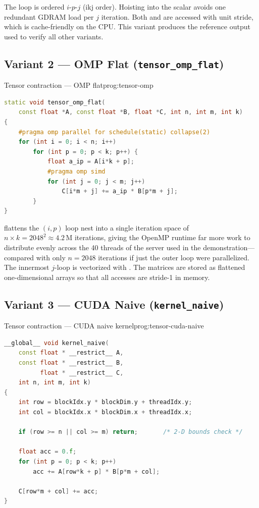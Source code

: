 The loop is ordered $i$-$p$-$j$ (ikj order). Hoisting 
into the scalar  avoids one redundant GDRAM load per $j$
iteration. Both  and  are accessed with
unit stride, which is cache-friendly on the CPU. This variant produces the
reference output used to verify all other variants.


\subsection{Variant 2 --- OMP Flat (\texttt{tensor\_omp\_flat})}
\label{ssec:code-omp}

\begin{ppprogram}{Tensor contraction --- OMP flat}{prog:tensor-omp}
\begin{lstlisting}[language=C++]
static void tensor_omp_flat(
    const float *A, const float *B, float *C, int n, int m, int k)
{
    #pragma omp parallel for schedule(static) collapse(2)
    for (int i = 0; i < n; i++)
        for (int p = 0; p < k; p++) {
            float a_ip = A[i*k + p];
            #pragma omp simd
            for (int j = 0; j < m; j++)
                C[i*m + j] += a_ip * B[p*m + j];
        }
}
\end{lstlisting}
\end{ppprogram}

 flattens the $(i,p)$ loop nest into a single iteration
space of $n \times k = 2048^2 \approx 4.2\,\text{M}$ iterations, giving the
OpenMP runtime far more work to distribute evenly across the 40 threads of the
server used in the demonstration---compared with only $n = 2048$ iterations if
just the outer loop were parallelized. The innermost $j$-loop is vectorized
with . The matrices are stored as flattened
one-dimensional arrays so that all accesses are stride-1 in memory.


\subsection{Variant 3 --- CUDA Naive (\texttt{kernel\_naive})}
\label{ssec:code-cuda-naive}

\begin{ppprogram}{Tensor contraction --- CUDA naive kernel}{prog:tensor-cuda-naive}
\begin{lstlisting}[language=C++]
__global__ void kernel_naive(
    const float * __restrict__ A,
    const float * __restrict__ B,
          float * __restrict__ C,
    int n, int m, int k)
{
    int row = blockIdx.y * blockDim.y + threadIdx.y;
    int col = blockIdx.x * blockDim.x + threadIdx.x;

    if (row >= n || col >= m) return;       /* 2-D bounds check */

    float acc = 0.f;
    for (int p = 0; p < k; p++)
        acc += A[row*k + p] * B[p*m + col];

    C[row*m + col] += acc;
}
\end{lstlisting}
\end{ppprogram}

